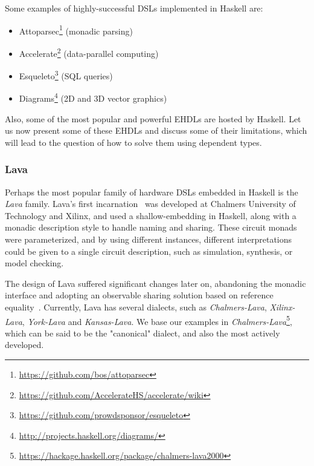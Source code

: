             Some examples of highly-successful \acp{DSL} implemented in Haskell are:

            \begin{itemize}
                \item Attoparsec\footnote{\url{https://github.com/bos/attoparsec}} (monadic parsing)
                \item Accelerate\footnote{\url{https://github.com/AccelerateHS/accelerate/wiki}} (data-parallel computing)
                \item Esqueleto\footnote{\url{https://github.com/prowdsponsor/esqueleto}} (SQL queries)
                \item Diagrams\footnote{\url{http://projects.haskell.org/diagrams/}} (2D and 3D vector graphics)
            \end{itemize}

            Also, some of the most popular and powerful \acp{EHDL} are hosted by Haskell.
            Let us now present some of these \acp{EHDL} and discuss some of their limitations,
            which will lead to the question of how to solve them using dependent types.

            \subsubsection{Lava}
            Perhaps the most popular family of hardware \acp{DSL} embedded in Haskell is the \emph{Lava} family.
            Lava's first incarnation~\cite{lava-1999} was developed at Chalmers University of Technology
            and Xilinx, and used a shallow-embedding in Haskell, along with a monadic description style
            to handle naming and sharing.
            These circuit monads were parameterized, and by using different instances,
            different interpretations could be given to a single circuit description, such as
            simulation, synthesis, or model checking.

            The design of Lava suffered significant changes later on, abandoning the monadic interface
            and adopting an observable sharing solution based on reference equality~\cite{observable-sharing-circuits}.
            Currently, Lava has several dialects, such as \emph{Chalmers-Lava}, \emph{Xilinx-Lava}, \emph{York-Lava} and \emph{Kansas-Lava}.
            We base our examples in \emph{Chalmers-Lava}\footnote{\url{https://hackage.haskell.org/package/chalmers-lava2000}},
            which can be said to be the "canonical" dialect, and also the most actively developed.

